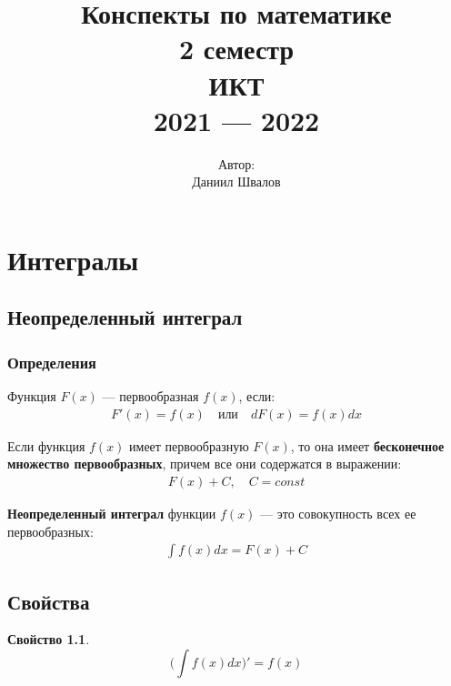 \documentclass[a4paper,12pt,oneside]{extbook}
\title{
    Конспекты по математике \\
    \vspace{2cm} 2 семестр \\
    \vspace{2cm} ИКТ \\
    2021 — 2022
    \vfill
}
\author{
    Автор: \\
    Даниил Швалов
}
\date{}
\theoremstyle{numbered}
\newtheorem{property}{Свойство}[section]
\theoremstyle{unnumbered}
\theoremstyle{named}
\theoremstyle{unnumbered}
\theoremstyle{named}
\theoremstyle{named}
\theoremstyle{named}
\begin{document}
\begin{titlepage}
    \pagestyle{empty}
    \cleardoublepage
    \maketitle
    \thispagestyle{empty}
\end{titlepage}

\setcounter{page}{2}
{
    \setcounter{tocdepth}{4}
    \hypersetup{linkcolor=black}
    \tableofcontents
}

\chapter{Интегралы}%
\label{cha:Интегралы}

\section{Неопределенный интеграл}%
\label{sec:Неопределенный интеграл}

\subsection{Определения}%
\label{sub:Определения}

Функция \(F(x)\) — первообразная \(f(x)\), если:
\begin{gather*}
    F'(x) = f(x) \quad \text{или} \quad dF(x) = f(x) dx
\end{gather*}

Если функция \(f(x)\) имеет первообразную \(F(x)\), то она имеет \textbf{бесконечное множество первообразных}, причем все они содержатся в выражении:
\begin{gather*}
    F(x) + C, \quad C = const
\end{gather*}

\textbf{Неопределенный интеграл} функции \(f(x)\) — это совокупность всех ее первообразных:
\begin{gather*}
    \int f(x)dx = F(x) + C
\end{gather*}

\section{Свойства}%
\label{sec:Свойства}

\begin{property}
    \begin{equation}
        \Bigg(\int f(x) dx\Bigg)' = f(x)
    \end{equation}
\end{property}
\end{document}
